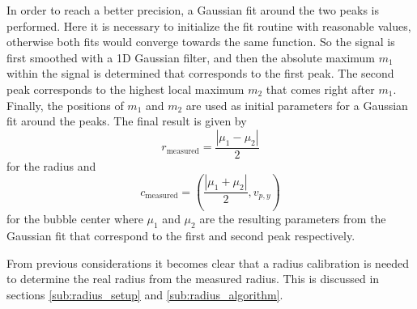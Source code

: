	In order to reach a better precision, a Gaussian fit around the two peaks is performed. Here it is necessary to initialize the fit routine with reasonable values, otherwise both fits would converge towards the same function. So the signal is first smoothed with a 1D Gaussian filter, and then the absolute maximum $m_1$ within the signal is determined that corresponds to the first peak. The second peak corresponds to the highest local maximum $m_2$ that comes right after $m_1$. Finally, the positions of $m_1$ and $m_2$ are used as initial parameters for a Gaussian fit around the peaks. The final result is given by
	\begin{equation}
		r_{\text{measured}} = \dfrac{| \mu_1 - \mu_2 |}{2}
		\label{eq:get_radius}
	\end{equation}
	for the radius and 
	\begin{equation}
		c_{\text{measured}} =
						 \left( 
							\dfrac{| \mu_1 + \mu_2 |}{2} ,
							 v_{p,y}
						 \right)
	\end{equation}
	for the bubble center 
	where $\mu_1$ and $\mu_2$ are the resulting parameters from the Gaussian fit that correspond to the first and second peak respectively. 
	
	From previous considerations it becomes clear that a radius calibration is needed to determine the real radius from the measured radius. This is discussed in sections \ref{sub:radius_setup} and \ref{sub:radius_algorithm}.

